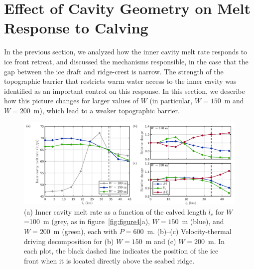 \documentclass[draft]{agujournal2019}
\begin{document}
\section{Effect of Cavity Geometry on Melt Response to Calving}\label{S:Results:H}
In the previous section, we analyzed how the inner cavity melt rate responds to ice front retreat, and discussed the mechanisms responsible, in the case that the gap between the ice draft and ridge-crest is narrow. The strength of the topographic barrier that restricts warm water access to the inner cavity was identified as an important control on this response. In this section, we describe how this picture changes for larger values of $W$ (in particular, $W=150$~m and $W=200$~m), which lead to a weaker topographic barrier.



\begin{figure}
    \centering
    \includegraphics[width = \textwidth]{../make_figures/plots/figure6.png}
    \caption{(a) Inner cavity melt rate as a function of the calved length $l_c$ for $W$=100~m (grey, as in figure~\ref{fig:figure4}a), $W=150$~m (blue), and $W=200$~m (green), each with $P = 600$~m.  (b)--(c) Velocity-thermal driving decomposition for (b) $W = 150$~m and (c) $W = 200$~m. In each plot, the black dashed line indicates the position of the ice front when it is located directly above the seabed ridge.}
    \label{fig:figure6}
\end{figure}
\end{document}
